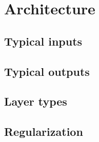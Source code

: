 \section{Architecture}
	\subsection{Typical inputs}
	\subsection{Typical outputs}
	\subsection{Layer types}
	\subsection{Regularization}
